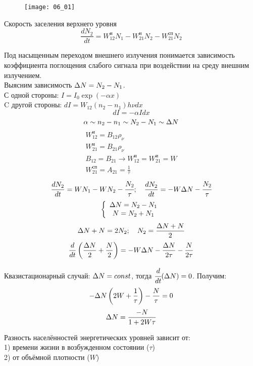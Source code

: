 
\begin{figure}[h]
	\center
	\texttt{[image: 06\_01]}
\end{figure}

Скорость заселения верхнего уровня
\[
	\frac{dN_2}{dt} = W^\text{и}_{12} N_1 - W^\text{и}_{21} N_2 - 
    	W^\text{сп}_{21} N_2
\]

Под насыщенным переходом внешнего излучения понимается зависимость 
коэффициента поглощения слабого сигнала при воздействии на среду внешним 
излучением. \\
Выясним зависимость \( \Delta N = N_2 - N_1 \). \\
С одной стороны: \( I = I_0 \exp(-\alpha x) \) \\
C другой стороны: \( dI = W_{12}(n_2 - n_1 ) h\nu dx \)
\[ 
	dI = -\alpha I dx
\]
\[
	\alpha \sim n_2 - n_1 \sim N_2 - N_1 \sim \Delta N 
\]
\[
\begin{array}{c}
	W^\text{и}_{12} = B_{12} \rho_\nu \\
    W^\text{и}_{21} = B_{21} \rho_\nu \\
    B_{12} = B_{21} \rightarrow W^\text{и}_{12} = W^\text{и}_{21} = W \\
    W^\text{сп}_{21} = A_{21} = \frac{1}{\tau}
\end{array} 
\]
\[
	\frac{dN_2}{dt} = WN_1 - WN_2 - \cfrac{N_2}{\tau};\quad
    \frac{dN_2}{dt} = -W\Delta N - \cfrac{N_2}{\tau}
\]
\[
	\left\{ \begin{array}{c}
    	\Delta N = N_2 - N_1 \\
        N = N_2 + N_1 
    \end{array} \right.
\]
\[
	\Delta N + N = 2N_2;\quad
    N_2 = \frac{\Delta N + N}{2}
\]
\[
	\frac{d}{dt}\left( \frac{\Delta N}{2} + \frac{N}{2} \right) = -W\Delta N - 
    	\frac{\Delta N}{2\tau} - \frac{N}{2\tau}
\]

Квазистационарный случай: \( \Delta N = const \), тогда 
\( \cfrac{d}{dt}(\Delta N) = 0 \). Получим:
\[
	-\Delta N\left( 2W + \frac{1}{\tau} \right) - \frac{N}{\tau} = 0
\]
\[
	\Delta N = \frac{-N}{1+2W\tau}
\]

Разность населённостей энергетических уровней зависит от: \\
1) времени жизни в возбужденном состоянии (\( \tau \)) \\
2) от объёмной плотности (\( W \))